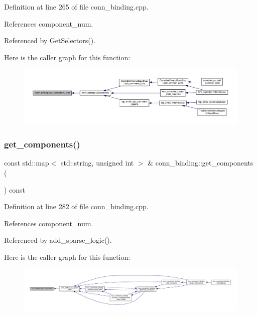 Definition at line 265 of file conn\+\_\+binding.\+cpp.



References component\+\_\+num.



Referenced by Get\+Selectors().

Here is the caller graph for this function\+:
\nopagebreak
\begin{figure}[H]
\begin{center}
\leavevmode
\includegraphics[width=350pt]{d2/db1/classconn__binding_ae44e000813aa8342a78b2dee1009c66b_icgraph}
\end{center}
\end{figure}
\mbox{\label{classconn__binding_a26e9ce42b031e5b5051a6e4aad81c0bd}} 
\subsubsection{\texorpdfstring{get\+\_\+components()}{get\_components()}}
{\footnotesize\ttfamily const std\+::map$<$ std\+::string, unsigned int $>$ \& conn\+\_\+binding\+::get\+\_\+components (\begin{DoxyParamCaption}{ }\end{DoxyParamCaption}) const}



Definition at line 282 of file conn\+\_\+binding.\+cpp.



References component\+\_\+num.



Referenced by add\+\_\+sparse\+\_\+logic().

Here is the caller graph for this function\+:
\nopagebreak
\begin{figure}[H]
\begin{center}
\leavevmode
\includegraphics[width=350pt]{d2/db1/classconn__binding_a26e9ce42b031e5b5051a6e4aad81c0bd_icgraph}
\end{center}
\end{figure}
\mbox{\label{classconn__binding_a39a42582d79c8e8cb85017f32ec7c56c}} 

